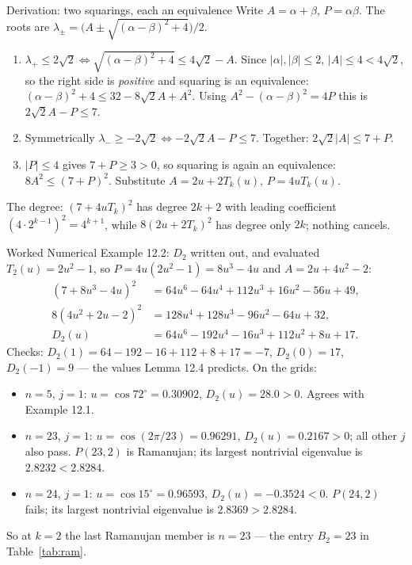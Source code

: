 \documentclass[11pt]{article}
\begin{document}
\begin{defbox}{Derivation: two squarings, each an equivalence}
Write $A=\alpha+\beta$, $P=\alpha\beta$. The roots are $\lambda_\pm=\bigl(A\pm\sqrt{(\alpha-\beta)^2+4}\bigr)/2$.
\begin{enumerate}[leftmargin=*,nosep]
  \item $\lambda_+\le2\sqrt2\iff\sqrt{(\alpha-\beta)^2+4}\le4\sqrt2-A$. Since $|\alpha|,|\beta|\le2$, $|A|\le4<4\sqrt2$, so the right side is \emph{positive} and squaring is an equivalence: $(\alpha-\beta)^2+4\le32-8\sqrt2A+A^2$. Using $A^2-(\alpha-\beta)^2=4P$ this is $2\sqrt2A-P\le7$.
  \item Symmetrically $\lambda_-\ge-2\sqrt2\iff-2\sqrt2A-P\le7$. Together: $2\sqrt2|A|\le7+P$.
  \item $|P|\le4$ gives $7+P\ge3>0$, so squaring is again an equivalence: $8A^2\le(7+P)^2$. Substitute $A=2u+2T_k(u)$, $P=4uT_k(u)$. \qedhere
\end{enumerate}
The degree: $(7+4uT_k)^2$ has degree $2k+2$ with leading coefficient $(4\cdot2^{k-1})^2=4^{k+1}$, while $8(2u+2T_k)^2$ has degree only $2k$; nothing cancels.
\end{defbox}

\begin{callbox}{Worked Numerical Example 12.2: $D_2$ written out, and evaluated}
$T_2(u)=2u^2-1$, so $P=4u(2u^2-1)=8u^3-4u$ and $A=2u+4u^2-2$:
\begin{align}
  (7+8u^3-4u)^2&=64u^6-64u^4+112u^3+16u^2-56u+49,\\
  8(4u^2+2u-2)^2&=128u^4+128u^3-96u^2-64u+32,\\
  D_2(u)&=64u^6-192u^4-16u^3+112u^2+8u+17 .
\end{align}
Checks: $D_2(1)=64-192-16+112+8+17=-7$, $D_2(0)=17$, $D_2(-1)=9$ --- the values Lemma 12.4 predicts. On the grids:
\begin{itemize}[leftmargin=*,nosep]
  \item $n=5$, $j=1$: $u=\cos72^\circ=0.30902$, $D_2(u)=28.0>0$. Agrees with Example 12.1.
  \item $n=23$, $j=1$: $u=\cos(2\pi/23)=0.96291$, $D_2(u)=0.2167>0$; all other $j$ also pass. $P(23,2)$ is Ramanujan; its largest nontrivial eigenvalue is $2.8232<2.8284$.
  \item $n=24$, $j=1$: $u=\cos15^\circ=0.96593$, $D_2(u)=-0.3524<0$. $P(24,2)$ fails; its largest nontrivial eigenvalue is $2.8369>2.8284$.
\end{itemize}
So at $k=2$ the last Ramanujan member is $n=23$ --- the entry $B_2=23$ in Table~\ref{tab:ram}.
\end{callbox}
\end{document}
